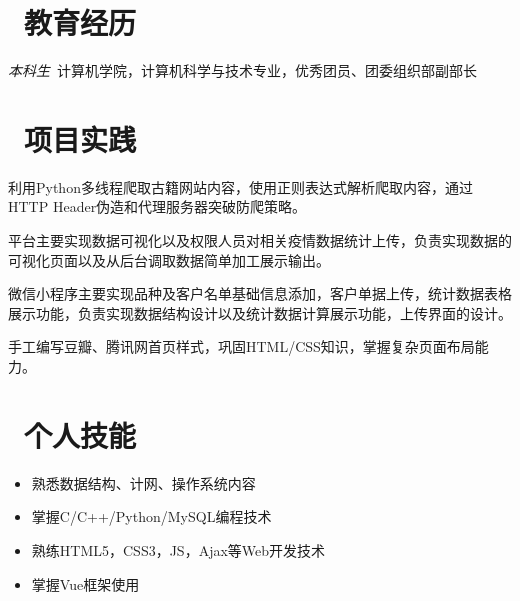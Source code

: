 \documentclass{resume}
\begin{document}



\section{\faGraduationCap\  教育经历}
\textit{本科生}\ 计算机学院，计算机科学与技术专业，优秀团员、团委组织部副部长

\section{\faCode\ 项目实践}
\begin{onehalfspacing}
  利用Python多线程爬取古籍网站内容，使用正则表达式解析爬取内容，通过HTTP Header伪造和代理服务器突破防爬策略。
\end{onehalfspacing}

\begin{onehalfspacing}
  平台主要实现数据可视化以及权限人员对相关疫情数据统计上传，负责实现数据的可视化页面以及从后台调取数据简单加工展示输出。
\end{onehalfspacing}

\begin{onehalfspacing}
  微信小程序主要实现品种及客户名单基础信息添加，客户单据上传，统计数据表格展示功能，负责实现数据结构设计以及统计数据计算展示功能，上传界面的设计。
\end{onehalfspacing}

\begin{onehalfspacing}
  手工编写豆瓣、腾讯网首页样式，巩固HTML/CSS知识，掌握复杂页面布局能力。
\end{onehalfspacing}
\section{\faCogs\ 个人技能}
\begin{itemize}[parsep=0.5ex]
  \item 熟悉数据结构、计网、操作系统内容
  \item 掌握C/C++/Python/MySQL编程技术
  \item 熟练HTML5，CSS3，JS，Ajax等Web开发技术
  \item 掌握Vue框架使用
\end{itemize}

%
%
\end{document}
